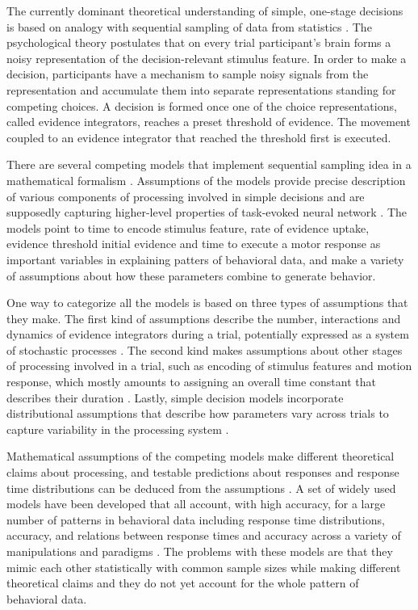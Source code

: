 \documentclass[12pt]{article}
\begin{document}
The currently dominant theoretical understanding of simple, one-stage decisions is based on analogy with sequential sampling of data from statistics \citep{WalWol1948, BogBro2006}. The psychological theory postulates that on every trial participant's brain forms a noisy representation of the decision-relevant stimulus feature. In order to make a decision, participants have a mechanism to sample noisy signals from the representation and accumulate them into separate representations standing for competing choices. A decision is formed once one of the choice representations, called evidence integrators, reaches a preset threshold of evidence. The movement coupled to an evidence integrator that reached the threshold first is executed. 

There are several competing models that implement sequential sampling idea in a mathematical formalism  \citep{Sto1960,Pik1973,Rat1978,UshMcc2001,BroHea2008}. Assumptions of the models provide precise description of various components of processing involved in simple decisions and are supposedly capturing higher-level properties of task-evoked neural network \citep{CasHea2014,MulMaa2014,ColBas2014}. The models point to time to encode stimulus feature, rate of evidence uptake, evidence threshold initial evidence and time to execute a motor response as important variables in explaining patters of behavioral data, and make a variety of assumptions about how these parameters combine to generate behavior. 

One way to categorize all the models is based on three types of assumptions that they make. The first kind of assumptions describe  the number, interactions and dynamics of evidence integrators during a trial, potentially expressed as a system of stochastic processes \citep{Smi2000}. The second kind makes assumptions about other stages of processing involved in a trial, such as encoding of stimulus features and motion response, which mostly amounts to assigning an overall time constant that describes their duration \citep{RatSmi2004}. Lastly, simple decision models incorporate distributional assumptions that describe how parameters vary across trials to capture variability in the processing system \citep{JonDzh2014}. 

Mathematical assumptions of the competing models make different theoretical claims about processing, and testable predictions about responses and response time distributions can be deduced from the assumptions \citep{Vic1979,Coo1983,Luc1986}. A set of widely used models have been developed that all account, with high accuracy, for a large number of patterns in behavioral data including response time distributions, accuracy, and relations between response times and accuracy across a variety of manipulations and paradigms \citep{UshMcc2001,RatTue2002,BroHea2008}. The problems with these models are that they mimic each other statistically with common sample sizes while making different theoretical claims \citep{ZanCol2000,RatSmi2004} and they do not yet account for the whole pattern of behavioral data.
\end{document}
